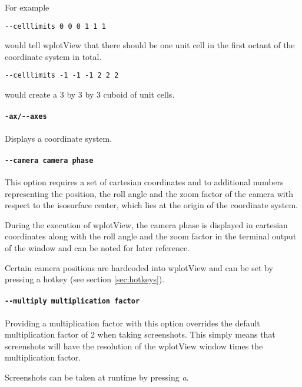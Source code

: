 \documentclass[12pt, parskip=full]{scrartcl}
\begin{document}
For example
\begin{verbatim}
--celllimits 0 0 0 1 1 1
\end{verbatim}
would tell wplotView that there should be one unit cell in the first octant of
the coordinate system in total.
\begin{verbatim}
--celllimits -1 -1 -1 2 2 2
\end{verbatim}
would create a 3 by 3 by 3 cuboid of unit cells.



\paragraph{\texttt{-ax/-{}-axes}}
Displays a coordinate system.

\paragraph{\texttt{-{}-camera camera phase}}

This option requires a set of cartesian coordinates and to additional numbers 
representing the position, the roll angle and the zoom factor of the
camera with respect to the isosurface center, which lies at the origin of the
coordinate system.

During the execution of wplotView, the camera phase is displayed in cartesian
coordinates along with the roll angle and the zoom factor
in the terminal output of the window and can be noted for later
reference.

Certain camera positions are hardcoded into wplotView and can be set by
pressing a hotkey (see section \ref{sec:hotkeys}).


\paragraph{\texttt{-{}-multiply multiplication factor}}

Providing a multiplication factor with this option overrides the default
multiplication factor of 2 when taking screenshots. This simply means that
screenshots will have the resolution of the wplotView window times the
multiplication factor.

Screenshots can be taken at runtime by pressing \emph{a}.
\end{document}
